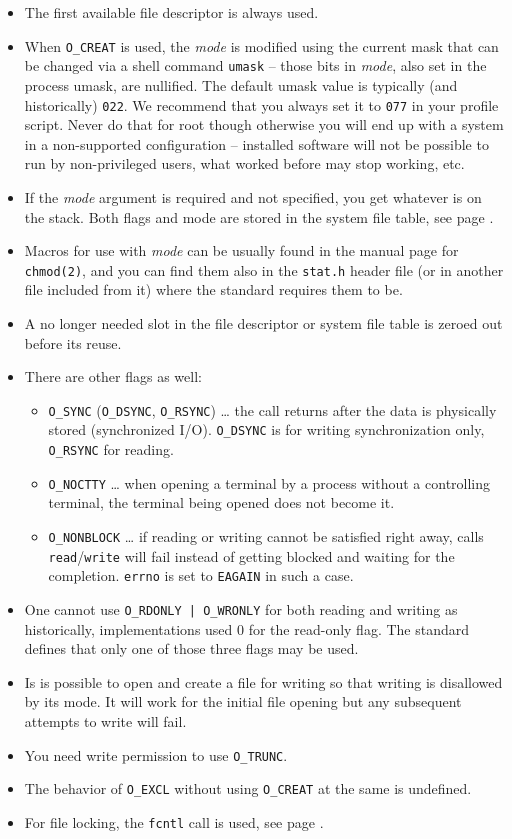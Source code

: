 \begin{itemize}
\item The first available file descriptor is always used.  
\item When \texttt{O\_CREAT} is used, the \emph{mode} is modified using the
current mask that can be changed via a shell command \texttt{umask} -- those
bits in \emph{mode}, also set in the process umask, are nullified.  The
default umask value is typically (and historically) \texttt{022}.  We recommend
that you always set it to \texttt{077} in your profile script.  Never do that for
root though otherwise you will end up with a system in a non-supported
configuration -- installed software will not be possible to run by
non-privileged users, what worked before may stop working, etc.
\item If the \emph{mode} argument is required and not specified, you get
whatever is on the stack.  Both flags and mode are stored in the system file
table, see page \pageref{OPENFILETABLES}.
\item Macros for use with \emph{mode} can be usually found in the manual page
for \texttt{chmod(2)}, and you can find them also in the \texttt{stat.h} header
file (or in another file included from it) where the standard requires them to
be.
\item A no longer needed slot in the file descriptor or system file table is
zeroed out before its reuse. 
\item There are other flags as well:
\begin{itemize}
\item \texttt{O\_SYNC} (\texttt{O\_DSYNC}, \texttt{O\_RSYNC}) \dots{} the call
returns after the data is physically stored (synchronized I/O).
\texttt{O\_DSYNC} is for writing synchronization only, \texttt{O\_RSYNC} for
reading.
\item \texttt{O\_NOCTTY} \dots{} when opening a terminal by a process without a
controlling terminal, the terminal being opened does not become it.
\item \label{O_NONBLOCK} \texttt{O\_NONBLOCK} \dots{} if reading or writing
cannot be satisfied right away, calls \texttt{read}/\texttt{write} will fail
instead of getting blocked and waiting for the completion.  \texttt{errno} is
set to \texttt{EAGAIN} in such a case.
\end{itemize}
\item One cannot use \texttt{O\_RDONLY | O\_WRONLY} for both reading and writing
as historically, implementations used 0 for the read-only flag.  The standard
defines that only one of those three flags may be used.
\item Is is possible to open and create a file for writing so that writing is
disallowed by its mode.  It will work for the initial file opening but any subsequent
attempts to write will fail.
\item You need write permission to use \texttt{O\_TRUNC}.
\item The behavior of \texttt{O\_EXCL} without using \texttt{O\_CREAT} at the
same is undefined.
\item For file locking, the \texttt{fcntl} call is used, see page
\pageref{FCNTL}.
\end{itemize}

